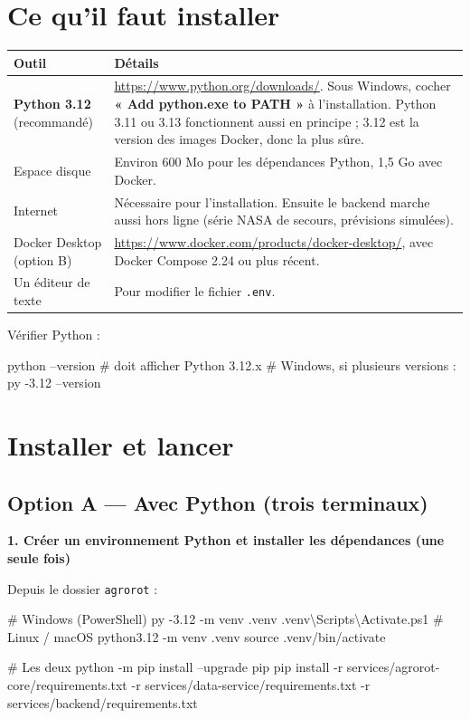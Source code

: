 \documentclass[11pt,a4paper]{article}
\begin{document}
\section{Ce qu'il faut installer}\label{sec:prerequis}

\begin{center}
\begin{tabularx}{\textwidth}{L{3.6cm}Y}
\toprule
\textbf{Outil} & \textbf{Détails} \\
\midrule
\textbf{Python 3.12} (recommandé) & \url{https://www.python.org/downloads/}. Sous Windows, cocher \textbf{« Add python.exe to PATH »} à l'installation. Python 3.11 ou 3.13 fonctionnent aussi en principe ; 3.12 est la version des images Docker, donc la plus sûre. \\
Espace disque & Environ 600 Mo pour les dépendances Python, 1,5 Go avec Docker. \\
Internet & Nécessaire pour l'installation. Ensuite le backend marche aussi hors ligne (série NASA de secours, prévisions simulées). \\
Docker Desktop (option B) & \url{https://www.docker.com/products/docker-desktop/}, avec Docker Compose 2.24 ou plus récent. \\
Un éditeur de texte & Pour modifier le fichier \texttt{.env}. \\
\bottomrule
\end{tabularx}
\end{center}

Vérifier Python :
\begin{code}
python --version          # doit afficher Python 3.12.x
# Windows, si plusieurs versions : py -3.12 --version
\end{code}

\section{Installer et lancer}\label{sec:lancer}

\subsection{Option A — Avec Python (trois terminaux)}

\textbf{1. Créer un environnement Python et installer les dépendances (une seule fois)}

Depuis le dossier \texttt{agrorot} :
\begin{code}
# Windows (PowerShell)
py -3.12 -m venv .venv
.venv\textbackslash{}Scripts\textbackslash{}Activate.ps1
# Linux / macOS
python3.12 -m venv .venv
source .venv/bin/activate

# Les deux
python -m pip install --upgrade pip
pip install -r services/agrorot-core/requirements.txt -r services/data-service/requirements.txt -r services/backend/requirements.txt
\end{code}
\end{document}
